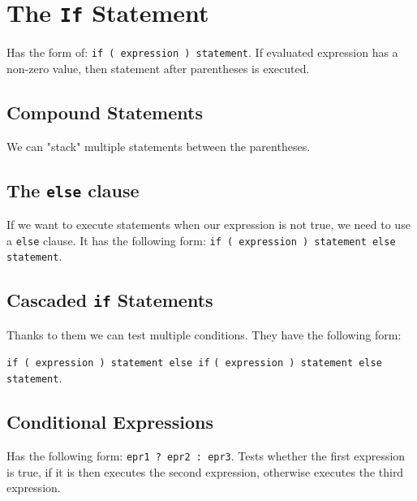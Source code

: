\documentclass[12pt, openany]{book}
\begin{document}
    \section{The \texttt{If} Statement}
    Has the form of: \texttt{if ( expression ) statement}. If evaluated expression has a
    non-zero value, then statement after parentheses is executed.

    \subsection*{Compound Statements}
    We can "stack" multiple statements between the parentheses.

    \subsection*{The \texttt{else} clause}
    If we want to execute statements when our expression is not true, we need to use
    a \texttt{else} clause. It has the following form: \texttt{if ( expression )
    statement else statement}.

    \subsection*{Cascaded \texttt{if} Statements}
    Thanks to them we can test multiple conditions. They have the following form:

    \texttt{if ( expression ) statement else if} \texttt{( expression ) statement else} \\
    \texttt{statement}.

    \subsection*{Conditional Expressions}
    Has the following form: \texttt{epr1 ? epr2 : epr3}. Tests whether the first
    expression is true, if it is then executes the second expression, otherwise
    executes the third expression.
\end{document}
